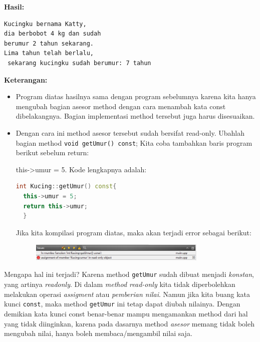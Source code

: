 \textbf{Hasil:}
\begin{verbatim}
Kucingku bernama Katty, 
dia berbobot 4 kg dan sudah
berumur 2 tahun sekarang. 
Lima tahun telah berlalu,
 sekarang kucingku sudah berumur: 7 tahun
\end{verbatim}


\textbf{Keterangan:}

\begin{itemize}
\item
  Program diatas hasilnya sama dengan program sebelumnya karena kita
  hanya mengubah bagian asesor method dengan cara menambah kata const
  dibelakangnya. Bagian implementasi method tersebut juga harus
  disesuaikan.
\item
  Dengan cara ini method asesor tersebut sudah bersifat read-only.
  Ubahlah bagian method \texttt{void\ getUmur()\ const}; Kita coba
  tambahkan baris program berikut sebelum return:

  this-\textgreater{}umur = 5.
  Kode lengkapnya adalah:
  
  \begin{lstlisting}[language=c++]
  int Kucing::getUmur() const{
  this->umur = 5;
  return this->umur;
  }
  \end{lstlisting}
  
  Jika kita kompilasi program diatas, maka akan terjadi error sebagai
  berikut:
  
  \begin{figure}[htbp]
  	\centering
  	\includegraphics[width=0.8\textwidth]{images/capture6-3.png}

  \end{figure}
\end{itemize}



Mengapa hal ini terjadi? Karena method \texttt{getUmur} sudah dibuat
menjadi \emph{konstan}, yang artinya \emph{readonly}. Di dalam
\emph{method read-only} kita tidak diperbolehkan melakukan operasi
\emph{assigment} atau \emph{pemberian nilai}. Namun jika kita buang kata
kunci \texttt{const}, maka method \texttt{getUmur} ini tetap dapat
diubah nilainya. Dengan demikian kata kunci const benar-benar mampu
mengamankan method dari hal yang tidak diinginkan, karena pada dasarnya
method \emph{asesor} memang tidak boleh mengubah nilai, hanya boleh
membaca/mengambil nilai saja.

